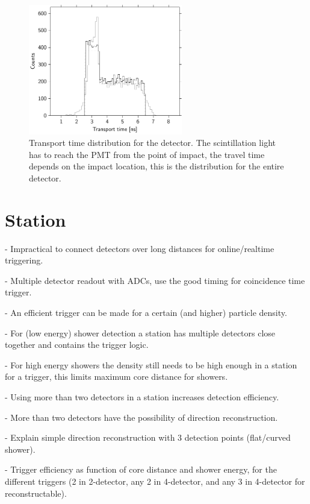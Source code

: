 \begin{figure}
    \centering
    \includegraphics[width=0.6\textwidth]
                    {plots/experiment/transport_time}
    \caption{Transport time distribution for the detector. The scintillation light has to reach the PMT from the point of impact, the travel time depends on the impact location, this is the distribution for the entire detector.}
    \label{fig:transport_time}
\end{figure}


\section{Station}

- Impractical to connect detectors over long distances for online/realtime triggering.

- Multiple detector readout with ADCs, use the good timing for coincidence time trigger.

- An efficient trigger can be made for a certain (and higher) particle density.

- For (low energy) shower detection a station has multiple detectors close together and contains the trigger logic.

- For high energy showers the density still needs to be high enough in a station for a trigger, this limits maximum core distance for showers.

- Using more than two detectors in a station increases detection efficiency.

- More than two detectors have the possibility of direction reconstruction.

- Explain simple direction reconstruction with 3 detection points (flat/curved shower).

- Trigger efficiency as function of core distance and shower energy, for the different triggers (2 in 2-detector, any 2 in 4-detector, and any 3 in 4-detector for reconstructable).

